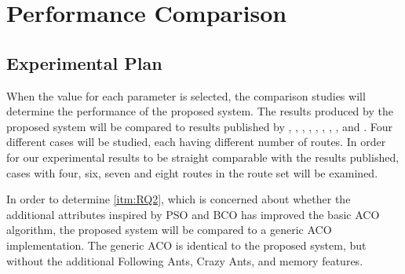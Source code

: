 \section{Performance Comparison}
\label{sec:performanceComparison}
\subsection{Experimental Plan}
When the value for each parameter is selected, the comparison studies will determine the performance of the proposed system. The results produced by the proposed system will be compared to results published by \citet{mandl79}, \citet{kechagiopoulos14}, \citet{nikolic14}, \citet{kidwai98}, \citet{fan10}, \citet{chakroborty02}, \citet{zhang10}, \citet{chew12}, and \citet{baaj91}. Four different cases will be studied, each having different number of routes. In order for our experimental results to be straight comparable with the results published, cases with four, six, seven and eight routes in the route set will be examined.

In order to determine \vref{itm:RQ2}, which is concerned about whether the additional attributes inspired by PSO and BCO has improved the basic ACO algorithm, the proposed system will be compared to a generic ACO implementation. The generic ACO is identical to the proposed system, but without the additional Following Ants, Crazy Ants, and memory features. 

